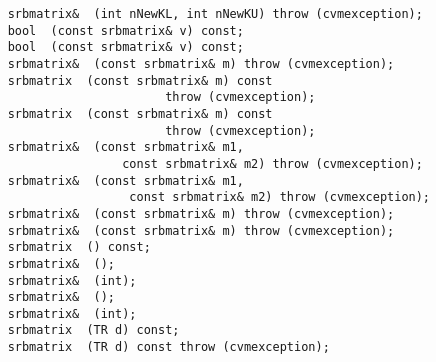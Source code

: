 \verb"    srbmatrix& "\verb" (int nNewKL, int nNewKU) throw (cvmexception);"\\
\verb"    bool "\verb" (const srbmatrix& v) const;"\\
\verb"    bool "\verb" (const srbmatrix& v) const;"\\
\verb"    srbmatrix& "\verb" (const srbmatrix& m) throw (cvmexception);"\\
\verb"    srbmatrix "\verb" (const srbmatrix& m) const"\\
\verb"                          throw (cvmexception);"\\
\verb"    srbmatrix "\verb" (const srbmatrix& m) const"\\
\verb"                          throw (cvmexception);"\\
\verb"    srbmatrix& "\verb" (const srbmatrix& m1,"\\
\verb"                    const srbmatrix& m2) throw (cvmexception);"\\
\verb"    srbmatrix& "\verb" (const srbmatrix& m1,"\\
\verb"                     const srbmatrix& m2) throw (cvmexception);"\\
\verb"    srbmatrix& "\verb" (const srbmatrix& m) throw (cvmexception);"\\
\verb"    srbmatrix& "\verb" (const srbmatrix& m) throw (cvmexception);"\\
\verb"    srbmatrix "\verb" () const;"\\
\verb"    srbmatrix& "\verb" ();"\\
\verb"    srbmatrix& "\verb" (int);"\\
\verb"    srbmatrix& "\verb" ();"\\
\verb"    srbmatrix& "\verb" (int);"\\
\verb"    srbmatrix "\verb" (TR d) const;"\\
\verb"    srbmatrix "\verb" (TR d) const throw (cvmexception);"\\
